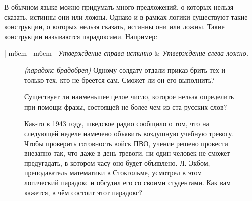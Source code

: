 В обычном языке можно придумать много предложений, о которых нельзя сказать, истинны они или ложны. Однако и в рамках логики существуют такие конструкции, о которых нельзя сказать, истинны они или ложны. Такие конструкции называются парадоксами. Например:

\begin{center}
    \begin{tabular}{ | m{6cm} | m{6cm} | } 
        \hline
        \textit{Утверждение справа истинно} & \textit{Утверждение слева ложно.} \\ 
        \hline
    \end{tabular}
\end{center}

\begin{figure}[H]
\begin{minipage}{0.79\linewidth}\setlength{\parindent}{1.5em}
    \begin{thm}
        \textit{(парадокс брадобрея)} Одному солдату отдали приказ брить тех и только тех, кто не бреется сам. Сможет ли он его выполнить?
    \end{thm}
    \begin{thm}
        Существует ли наименьшее целое число, которое нельзя определить при помощи фразы, состоящей не более чем из ста русских слов?
    \end{thm}
    \begin{thm}
        Как-то в 1943 году, шведское радио сообщило о том, что на следующей неделе намечено объявить воздушную учебную тревогу. Чтобы проверить готовность войск ПВО, учение решено провести внезапно так, что даже в день тревоги, ни один человек не сможет предугадать, в котором часу оно будет объявлено. Л. Экбом, преподаватель математики в Стокгольме, усмотрел в этом логический парадокс и обсудил его со своими студентами. Как вам кажется, в чём состоит этот парадокс?
    \end{thm}
\end{minipage}
\hfill
\begin{minipage}{0.2\linewidth}

\end{minipage}
\end{figure}
